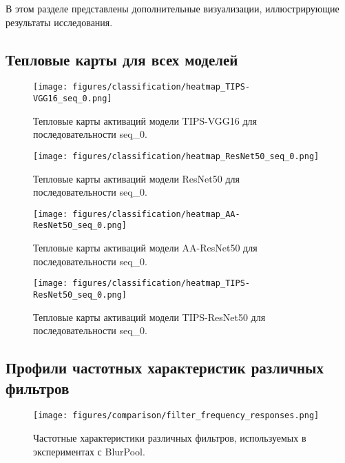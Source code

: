 В этом разделе представлены дополнительные визуализации, иллюстрирующие результаты исследования.

\subsection{Тепловые карты для всех моделей}
\label{appendix:additional_visualizations:heatmaps}

\begin{figure}[ht]
\centering
\texttt{[image: figures/classification/heatmap\_TIPS-VGG16\_seq\_0.png]}
\caption{Тепловые карты активаций модели TIPS-VGG16 для последовательности seq\_0.}
\label{fig:heatmap_tips_vgg16}
\end{figure}

\begin{figure}[ht]
\centering
\texttt{[image: figures/classification/heatmap\_ResNet50\_seq\_0.png]}
\caption{Тепловые карты активаций модели ResNet50 для последовательности seq\_0.}
\label{fig:heatmap_resnet50}
\end{figure}

\begin{figure}[ht]
\centering
\texttt{[image: figures/classification/heatmap\_AA-ResNet50\_seq\_0.png]}
\caption{Тепловые карты активаций модели AA-ResNet50 для последовательности seq\_0.}
\label{fig:heatmap_aa_resnet50}
\end{figure}

\begin{figure}[ht]
\centering
\texttt{[image: figures/classification/heatmap\_TIPS-ResNet50\_seq\_0.png]}
\caption{Тепловые карты активаций модели TIPS-ResNet50 для последовательности seq\_0.}
\label{fig:heatmap_tips_resnet50}
\end{figure}

\subsection{Профили частотных характеристик различных фильтров}
\label{appendix:additional_visualizations:filter_profiles}

\begin{figure}[ht]
\centering
\texttt{[image: figures/comparison/filter\_frequency\_responses.png]}
\caption{Частотные характеристики различных фильтров, используемых в экспериментах с BlurPool.}
\label{fig:filter_frequency_responses}
\end{figure}


